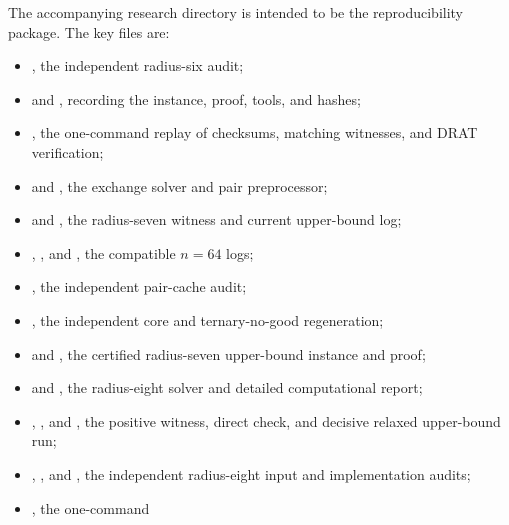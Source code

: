 \documentclass[11pt]{article}
\theoremstyle{definition}
\theoremstyle{remark}
\begin{document}
The accompanying research directory is intended to be the reproducibility
package.  The key files are:
\begin{itemize}[leftmargin=*]
  \item {}, the independent radius-six audit;
  \item {} and
  , recording the instance,
  proof, tools, and hashes;
  \item {}, the one-command replay of
  checksums, matching witnesses, and DRAT verification;
  \item {} and
  , the exchange solver and pair
  preprocessor;
  \item {} and
  , the radius-seven witness and
  current upper-bound log;
  \item {},
  , and
  , the compatible $n=64$ logs;
  \item {}, the independent
  pair-cache audit;
  \item {}, the independent core and
  ternary-no-good regeneration;
  \item {} and
  , the certified
  radius-seven upper-bound instance and proof;
  \item {} and
  , the radius-eight solver and detailed
  computational report;
  \item {},
  , and
  , the positive
  witness, direct check, and decisive relaxed upper-bound run;
  \item {},
  , and
  , the independent radius-eight
  input and implementation audits;
  \item {}, the one-command

\end{itemize}
\end{document}
